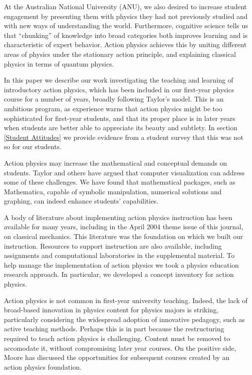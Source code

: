 \documentclass[prb,oncolumn]{revtex4-2}
\begin{document}
At the Australian National University (ANU), we also desired to increase student engagement by presenting them with physics they had not previously studied and with new ways of understanding the world. Furthermore, cognitive science tells us that ``chunking'' of knowledge into broad categories both improves learning and is characteristic of expert behavior. \cite{Reif,Docktor} Action physics achieves this by uniting different areas of physics under the stationary action principle, and explaining classical physics in terms of quantum physics.

In this paper we describe our work investigating the teaching and learning of introductory action physics, which has been included in our first-year physics course for a number of years, broadly following Taylor's model. This is an ambitious program, as experience warns that action physics might be too sophisticated for first-year students, and that its proper place is in later years when students are better able to appreciate its beauty and subtlety. In section \ref{Student Attitudes} we provide evidence from a student survey that this was not so for our students. 

Action physics may increase the mathematical and conceptual demands on students. 
Taylor \cite{TaylorCIP} and others \cite{Resources} have argued that computer visualization can address some of these challenges. We have found that mathematical packages, such as Mathematica, \cite{Mathematica} capable of symbolic manipulation, numerical solutions and graphing, can indeed enhance students' capabilities.

A body of literature about implementing action physics instruction has been available for many years, \cite{TaylorCIP, Hanc2003, Ogborn, Neuenschwander} including in the April 2004 theme issue of this journal, on classical mechanics. \cite{Moore, HancAJP2004a, HancAJP2004b, HancAJP2004c} This literature was the foundation on which we built our instruction.
Resources to support instruction are also available, \cite{Resources, QEDvideo} including assignments and computational laboratories in the supplemental material. \cite{supplement}  To help manage the implementation of action physics we took a physics education research approach. \cite{McDermott, ethics} In particular, we developed a concept inventory for action physics. \cite{McGinness}

Action physics is not common in first-year university teaching. Indeed, the lack of broad-based innovation in physics content for physics majors is striking, particularly considering the widespread adoption of innovative pedagogy, such as active teaching methods. \cite{Active} Perhaps this is in part because the restructuring required to teach action physics is challenging. Content must be removed to accomodate it, without compromising later year courses. On the positive side, Moore has discussed the opportunities for subsequent courses created by an action physics foundation. \cite{Moore} 
\end{document}
